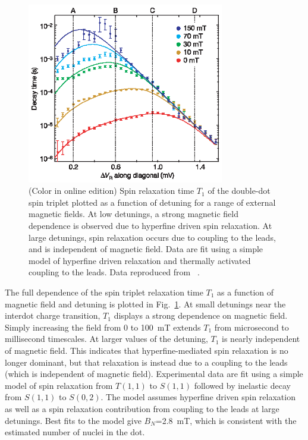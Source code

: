 \documentclass[rmp,twocolumn,aps]{revtex4}
\begin{document}
\begin{figure}[tb]
\includegraphics[width=8.6cm]{hanson_fig40.eps}
\caption{(Color in online edition) Spin relaxation time $T_1$ of the double-dot spin triplet plotted as a
function of detuning for a range of external magnetic fields. At
low detunings, a strong magnetic field dependence is observed due
to hyperfine driven spin relaxation. At large detunings, spin
relaxation occurs due to coupling to the leads, and is independent
of magnetic field. Data are fit using a simple model of hyperfine
driven relaxation and thermally activated coupling to the leads. Data
reproduced from ~\textcite{johnson05}.}
\label{Fig:Johnson:Decay}
\end{figure}

The full dependence of the spin triplet relaxation time $T_1$ as a function
of magnetic field and detuning is plotted in Fig.\
\ref{Fig:Johnson:Decay}. At small detunings near the interdot
charge transition, $T_1$ displays a strong dependence on magnetic field. Simply increasing the field from 0 to 100~mT extends
$T_1$ from microsecond to millisecond timescales. At
larger values of the detuning, $T_1$ is nearly independent of magnetic field. This indicates that hyperfine-mediated spin relaxation is no longer dominant, but that relaxation is instead due to a coupling to the leads (which is independent of magnetic field). Experimental data are fit using a simple
model of spin relaxation from $T(1,1)$ to $S(1,1)$ followed by
inelastic decay from $S(1,1)$ to $S(0,2)$. The model assumes
hyperfine driven spin relaxation as well as a spin relaxation
contribution from coupling to the leads at large detunings. Best
fits to the model give $B_{N}$=2.8~mT, which is consistent with the
estimated number of nuclei in the dot.

\end{document}
